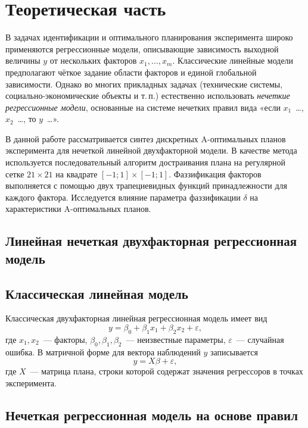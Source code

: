 \documentclass[a4paper,12pt]{article}
\begin{document}
\section{Теоретическая часть}

В задачах идентификации и оптимального планирования эксперимента
широко применяются регрессионные модели, описывающие зависимость
выходной величины $y$ от нескольких факторов $x_1,\dots,x_m$.
Классические линейные модели предполагают чёткое задание
области факторов и единой глобальной зависимости.
Однако во многих прикладных задачах (технические системы,
социально-экономические объекты и т.\,п.)
естественно использовать \emph{нечеткие регрессионные модели},
основанные на системе нечетких правил вида
«если $x_1$~\dots, $x_2$~\dots, то $y$~\dots».

В данной работе рассматривается синтез дискретных A-оптимальных
планов эксперимента для нечеткой линейной двухфакторной модели.
В качестве метода используется последовательный алгоритм
достраивания плана на регулярной сетке $21\times 21$
на квадрате $[-1;1]\times[-1;1]$.
Фаззификация факторов выполняется с помощью двух трапециевидных
функций принадлежности для каждого фактора.
Исследуется влияние параметра фаззификации $\delta$
на характеристики A-оптимальных планов.

\subsection{Линейная нечеткая двухфакторная регрессионная модель}

\subsection{Классическая линейная модель}

Классическая двухфакторная линейная регрессионная модель имеет вид
\begin{equation}
y = \beta_0 + \beta_1 x_1 + \beta_2 x_2 + \varepsilon,
\end{equation}
где $x_1, x_2$~--- факторы, $\beta_0,\beta_1,\beta_2$~---
неизвестные параметры, $\varepsilon$~--- случайная ошибка.
В матричной форме для вектора наблюдений $y$ записывается
\begin{equation}
y = X \beta + \varepsilon,
\end{equation}
где $X$~--- матрица плана, строки которой содержат значения регрессоров
в точках эксперимента.

\subsection{Нечеткая регрессионная модель на основе правил}
\end{document}
